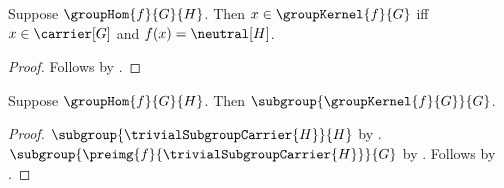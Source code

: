\begin{proposition}\label{group_kernel_iff}
    Suppose $\groupHom{f}{G}{H}$.
    Then $x\in\groupKernel{f}{G}$ iff
        $x\in\carrier[G]$ and $f(x)=\neutral[H]$.
\end{proposition}
\begin{proof}
    Follows by .
\end{proof}

\begin{theorem}\label{group_kernel_subgroup}
    Suppose $\groupHom{f}{G}{H}$.
    Then $\subgroup{\groupKernel{f}{G}}{G}$.
\end{theorem}
\begin{proof}
    $\subgroup{\trivialSubgroupCarrier{H}}{H}$ by
        .
    $\subgroup{\preimg{f}{\trivialSubgroupCarrier{H}}}{G}$ by
        .
    Follows by .
\end{proof}


